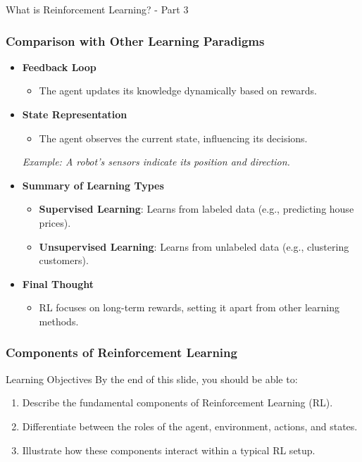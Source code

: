 \documentclass[aspectratio=169]{beamer}
\begin{document}
\begin{frame}[fragile]{What is Reinforcement Learning? - Part 3}
    \frametitle{Comparison with Other Learning Paradigms}
    \begin{itemize}
        \item \textbf{Feedback Loop}
            \begin{itemize}
                \item The agent updates its knowledge dynamically based on rewards.
            \end{itemize}
        
        \item \textbf{State Representation}
            \begin{itemize}
                \item The agent observes the current state, influencing its decisions.
            \end{itemize}
            \textit{Example: A robot's sensors indicate its position and direction.}
            
        \item \textbf{Summary of Learning Types}
            \begin{itemize}
                \item \textbf{Supervised Learning}: Learns from labeled data (e.g., predicting house prices).
                \item \textbf{Unsupervised Learning}: Learns from unlabeled data (e.g., clustering customers).
            \end{itemize}
        
        \item \textbf{Final Thought}
            \begin{itemize}
                \item RL focuses on long-term rewards, setting it apart from other learning methods.
            \end{itemize}
    \end{itemize}
\end{frame}

\begin{frame}[fragile]
    \frametitle{Components of Reinforcement Learning}
    \begin{block}{Learning Objectives}
        By the end of this slide, you should be able to:
        \begin{enumerate}
            \item Describe the fundamental components of Reinforcement Learning (RL).
            \item Differentiate between the roles of the agent, environment, actions, and states.
            \item Illustrate how these components interact within a typical RL setup.
        \end{enumerate}
    \end{block}
\end{frame}
\end{document}
